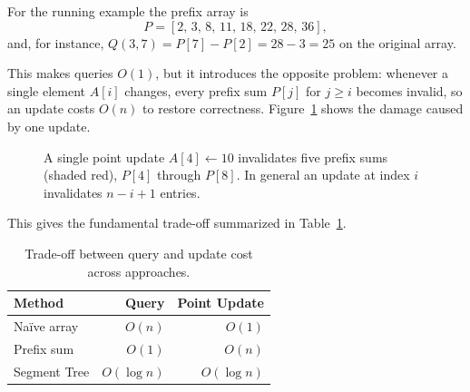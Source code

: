 \documentclass[
  11pt,
  a4paper,
  twoside=false,
  numbers=noenddot,
  headings=big,
  parskip=half,
  toc=bibliography,
  toc=listof,
  bibliography=totoc
]{scrreprt}
\newcounter{example}[chapter]
\begin{document}
For the running example the prefix array is
\[
P = [2,\,3,\,8,\,11,\,18,\,22,\,28,\,36],
\]
and, for instance, $Q(3,7) = P[7]-P[2] = 28-3 = 25$ on the original array.

This makes queries $O(1)$, but it introduces the opposite problem: whenever a single element $A[i]$ changes, every prefix sum $P[j]$ for $j \ge i$ becomes invalid, so an update costs $O(n)$ to restore correctness. Figure~\ref{fig:prefixupdate} shows the damage caused by one update.

\begin{figure}[h]
\centering
{}
\caption{A single point update $A[4]\leftarrow 10$ invalidates five prefix sums (shaded red), $P[4]$ through $P[8]$. In general an update at index $i$ invalidates $n-i+1$ entries.}
\label{fig:prefixupdate}
\end{figure}

This gives the fundamental trade-off summarized in Table~\ref{tab:tradeoff}.

\begin{table}[h]
\centering
\caption{Trade-off between query and update cost across approaches.}
\label{tab:tradeoff}
\begin{tabular}{lrr}
\toprule
\textbf{Method} & \textbf{Query} & \textbf{Point Update} \\
\midrule
Na\"ive array  & $O(n)$      & $O(1)$ \\
Prefix sum     & $O(1)$      & $O(n)$ \\
Segment Tree   & $O(\log n)$ & $O(\log n)$ \\
\bottomrule
\end{tabular}
\end{table}
\end{document}

